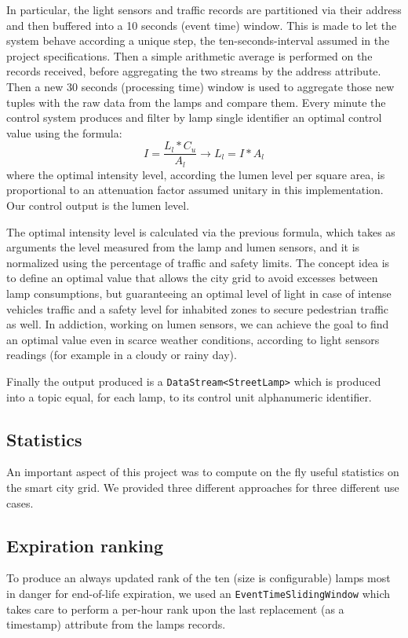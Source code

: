 In particular, the light sensors and traffic records are partitioned via their address and then buffered into a 10 seconds (event time) window. This is made to let the system behave according a unique step, the ten-seconds-interval assumed in the project specifications. Then a simple arithmetic average is performed on the records received, before aggregating the two streams by the address attribute. Then a new 30 seconds (processing time) window is used to aggregate those new tuples with the raw data from the lamps and compare them. Every minute the control system produces and filter by lamp single identifier an optimal control value using the formula:
	$$I = \frac{L_l*C_u}{A_l} \rightarrow L_l = I * A_l$$
where the optimal intensity level, according the lumen level per square area, is proportional to an attenuation factor assumed unitary in this implementation. Our control output is the lumen level.

The optimal intensity level is calculated via the previous formula, which takes as arguments the level measured from the lamp and lumen sensors, and it is normalized using the percentage of traffic and safety limits. The concept idea is to define an optimal value that allows the city grid to avoid excesses between lamp consumptions, but guaranteeing an optimal level of light in case of intense vehicles traffic and a safety level for inhabited zones to secure pedestrian traffic as well. In addiction, working on lumen sensors, we can achieve the goal to find an optimal value even in scarce weather conditions, according to light sensors readings (for example in a cloudy or rainy day).

Finally the output produced is a \texttt{DataStream<StreetLamp>} which is produced into a topic equal, for each lamp, to its control unit alphanumeric identifier.

\subsection{Statistics}
An important aspect of this project was to compute on the fly useful statistics on the smart city grid. We provided three different approaches for three different use cases.
\subsection*{Expiration ranking}
To produce an always updated rank of the ten (size is configurable) lamps most in danger for end-of-life expiration, we used an \texttt{EventTimeSlidingWindow} which takes care to perform a per-hour rank upon the last replacement (as a timestamp) attribute from the lamps records.
